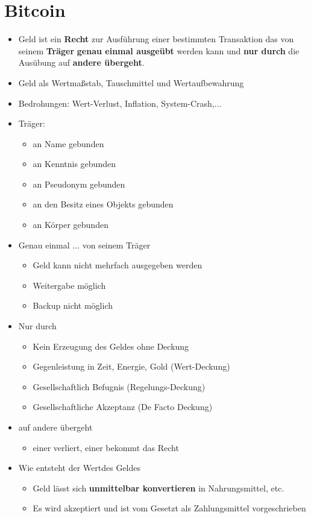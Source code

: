 \documentclass{article} %
\begin{document}
	\section{Bitcoin}
	\begin{itemize}
		\item \glqq Geld ist ein \textbf{Recht} zur Ausführung einer bestimmten Transaktion das von seinem \textbf{Träger} \textbf{genau einmal ausgeübt} werden kann und \textbf{nur durch} die Ausübung auf \textbf{andere übergeht}.\grqq
		\item Geld als Wertmaßstab, Tauschmittel und Wertaufbewahrung
		\item Bedrohungen: Wert-Verlust, Inflation, System-Crash,...
		\item \glqq Träger:\grqq
		\begin{itemize}
			\item an Name gebunden
			\item an Kenntnis gebunden
			\item an Pseudonym gebunden
			\item an den Besitz eines Objekts gebunden
			\item an Körper gebunden
		\end{itemize}
		\item \glqq Genau einmal ... von seinem Träger \grqq
		\begin{itemize}
			\item Geld kann nicht mehrfach ausgegeben werden
			\item Weitergabe möglich
			\item Backup nicht möglich
		\end{itemize}
		\item \glqq Nur durch\grqq
		\begin{itemize}
			\item Kein Erzeugung des Geldes ohne Deckung
			\item Gegenleistung in Zeit, Energie, Gold (Wert-Deckung)
			\item Gesellschaftlich Befugnis (Regelungs-Deckung)
			\item Gesellschaftliche Akzeptanz (De Facto Deckung)
		\end{itemize}
		\item \glqq auf andere übergeht\grqq
		\begin{itemize}
			\item einer verliert, einer bekommt das Recht
		\end{itemize}
		\item Wie entsteht der \glqq Wert\grqq des Geldes
		\begin{itemize}
			\item Geld lässt sich \textbf{unmittelbar konvertieren} in Nahrungsmittel, etc.
			\item Es wird akzeptiert und ist vom Gesetzt als Zahlungsmittel vorgeschrieben 
		\end{itemize}
	\end{itemize}
\end{document}
